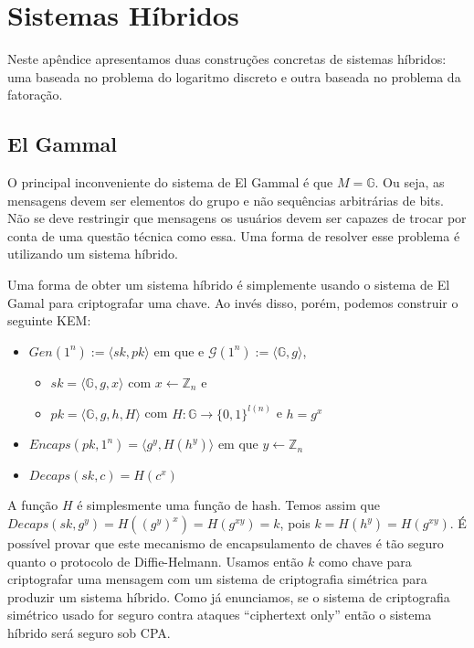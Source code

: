 \chapter{Sistemas Híbridos}
\label{cha:sistemas-hibridos}

Neste apêndice apresentamos duas construções concretas de sistemas híbridos: uma baseada no problema do logaritmo discreto e outra baseada no problema da fatoração.

\section{El Gammal}
\label{sec:el-gammal}

O principal inconveniente do sistema de El Gammal é que $M = \mathbb{G}$.
Ou seja, as mensagens devem ser elementos do grupo e não sequências arbitrárias de bits.
Não se deve restringir que mensagens os usuários devem ser capazes de trocar por conta de uma questão técnica como essa.
Uma forma de resolver esse problema é utilizando um sistema híbrido.

Uma forma de obter um sistema híbrido é simplemente usando o sistema de El Gamal para criptografar uma chave.
Ao invés disso, porém, podemos construir o seguinte KEM:

\begin{itemize}
\item $Gen(1^n) := \langle sk, pk \rangle$ em que e $\mathcal{G}(1^n) := \langle \mathbb{G}, g \rangle$, 
\begin{itemize}
\item $sk = \langle \mathbb{G}, g, x \rangle$ com $x \leftarrow \mathbb{Z}_n$ e
\item $pk = \langle \mathbb{G}, g, h, H \rangle$ com $H: \mathbb{G} \to \{0,1\}^{l(n)}$ e $h = g^x$
\end{itemize}
\item $Encaps(pk, 1^n) = \langle g^y, H(h^y)\rangle$ em que $y \leftarrow \mathbb{Z}_n$
\item $Decaps(sk, c) = H(c^x)$
\end{itemize}

A função $H$ é simplesmente uma função de hash.
Temos assim que $Decaps(sk, g^y) = H((g^y)^x) = H(g^{xy}) = k$, pois $k = H(h^y) = H(g^{xy})$.
É possível provar que este mecanismo de encapsulamento de chaves é tão seguro quanto o protocolo de Diffie-Helmann.
Usamos então $k$ como chave para criptografar uma mensagem com um sistema de criptografia simétrica para produzir um sistema híbrido.
Como já enunciamos, se o sistema de criptografia simétrico usado for seguro contra ataques ``ciphertext only'' então o sistema híbrido será seguro sob CPA.

